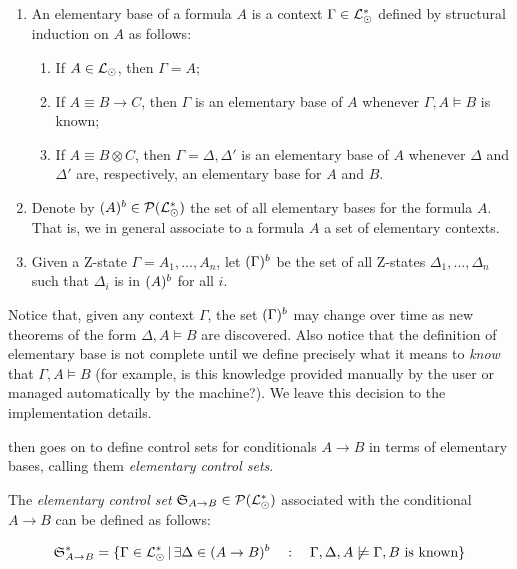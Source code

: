 \begin{definition}
  \begin{enumerate}
  \item An elementary base of a formula $A$ is a context
    $\Gamma \in \mathcal{L}_{\odot}^*$ defined by structural induction on $A$ as
    follows:

    \begin{enumerate}
    \item If $A \in \mathcal{L}_{\odot}$, then $\Gamma = A$;
    \item If $A \equiv B \rightarrow C$, then $\Gamma$ is an elementary base of
      $A$ whenever $\Gamma, A \models B$ is known;
    \item If $A \equiv B \otimes C$, then $\Gamma = \Delta, \Delta'$ is an
      elementary base of $A$ whenever $\Delta$ and $\Delta'$ are, respectively,
      an elementary base for $A$ and $B$.
    \end{enumerate}

  \item Denote by $(A)^{b} \in \mathcal{P}(\mathcal{L}_{\odot}^*)$ the set of all
    elementary bases for the formula $A$. That is, we in general associate to a
    formula $A$ a set of elementary contexts.
  \item Given a Z-state $\Gamma = A_1, \dots, A_n$, let $(\Gamma)^{b}$ be
    the set of all Z-states $\Delta_1, \dots, \Delta_n$ such that $\Delta_i$ is
    in $(A)^{b}$ for all $i$.
  \end{enumerate}
\end{definition}

Notice that, given any context $\Gamma$, the set $(\Gamma)^{b}$ may change
over time as new theorems of the form $\Delta, A \models B$ are discovered.
Also notice that the definition of elementary base is not complete until we
define precisely what it means to \emph{know} that $\Gamma, A \models B$ (for
example, is this knowledge provided manually by the user or managed
automatically by the machine?). We leave this decision to the implementation
details.

\cite{adding-logic} then goes on to define control sets for conditionals
$A \rightarrow B$ in terms of elementary bases, calling them \emph{elementary
  control sets}.

\begin{definition}
  The \emph{elementary control set}
  $\mathfrak{S}_{A \rightarrow B} \in \mathcal{P}(\mathcal{L}_{\odot}^*)$ associated with
  the conditional $A \rightarrow B$ can be defined as follows:

  \[
    \mathfrak{S}_{A \rightarrow B}^* = \{
    \Gamma \in \mathcal{L}_{\odot}^* \, | \, \exists \Delta \in (A \rightarrow
    B)^{b}
    \quad : \quad \Gamma, \Delta, A \not \models \Gamma, B \text{ is known}
    \}
  \]
\end{definition}

